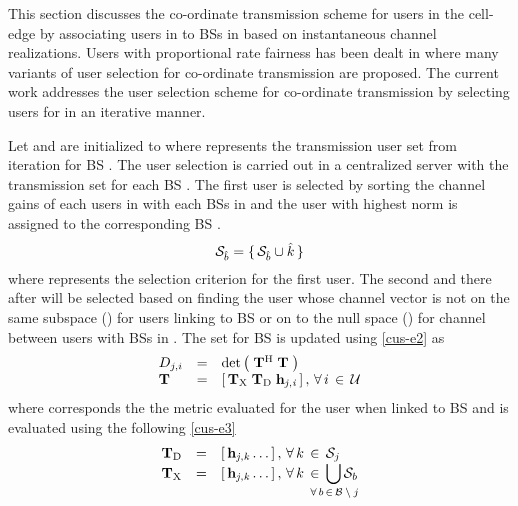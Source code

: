 
This section discusses the co-ordinate transmission scheme for users in the cell-edge by associating users in  to BSs in  based on instantaneous channel realizations. Users with proportional rate fairness has been dealt in \cite{antti_coord_user_selection} where many variants of user selection for co-ordinate transmission are proposed. The current work addresses the user selection scheme for co-ordinate transmission by selecting users for  in an iterative manner.

Let  and  are initialized to  where  represents the transmission user set from  iteration for BS . The user selection is carried out in a centralized server with the transmission set  for each BS . The first user is selected by sorting the channel gains of each users in  with each BSs in  and the user  with highest norm is assigned to the corresponding BS .
\begin{equation}
\mathcal{S}_{\hat{b}} = \lbrace \, \mathcal{S}_{\hat{b}} \cup \hat{k} \, \rbrace
\label{cus-e1}
\end{equation}
where  represents the selection criterion for the first user. The second and there after will be selected based on finding the user whose channel vector is not on the same subspace () for users linking to BS  or on to the null space () for channel between users with BSs in . The set  for BS  is updated using \eqref{cus-e2} as
\begin{equation}
\begin{array}{lcl}
D_{j,i} &=& \det \left ( \; \mathbf{T}^{\mathrm{H}} \; \mathbf{T} \; \right ) \\
\mathbf{T} &=& \left [ \, \mathbf{T}_{\mathrm{X}} \; \mathbf{T}_{\mathrm{D}} \; \mathbf{h}_{\mathit{j},\mathit{i}} \, \right ], \, \forall \, i \, \in \, \mathcal{U}
\end{array}
\label{cus-e2}
\end{equation}
where  corresponds the the metric evaluated for the user  when linked to BS  and  is evaluated using the following \eqref{cus-e3}
\begin{equation}
\begin{array}{lcl}
\mbf{T}_{\mrm{D}} &=& \matscont{\mvecxyz{h}{j}{k} \dotso}, \fall k \inm \mc{S}_j \\
\mbf{T}_{\mrm{X}} &=& \matscont{\mvecxyz{h}{j}{k} \dotso }, \fall k \inm \displaystyle \bigcup_{\mathclap{\fall b \inm \mc{B} \bs j}} \mc{S}_b
\end{array}
\label{cus-e3}
\end{equation}
